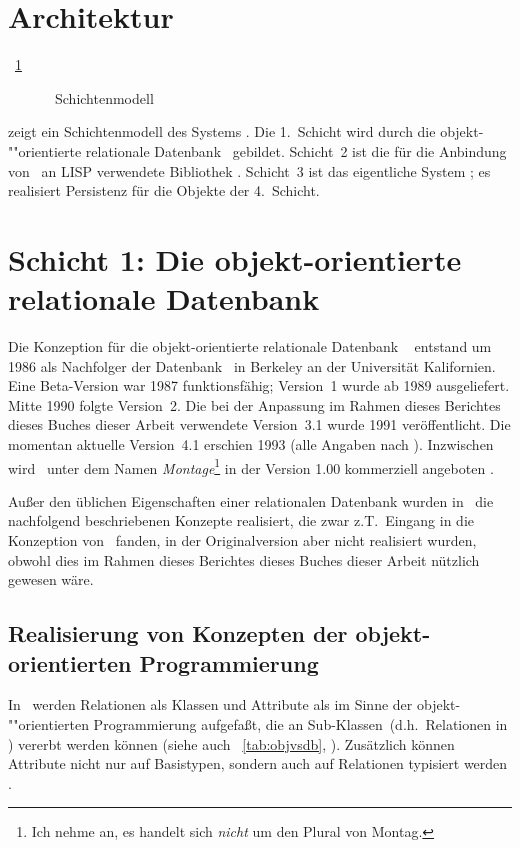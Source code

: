 \section{Architektur}
%
\figurename~\ref{fig:sohlay} %
%
\begin{figure}[htbp]%
\ifbuch%
\centerline{}%
\else%
\centerline{}%
\fi%
\caption{\protect\soh\ Schichtenmodell}%
\label{fig:sohlay}%
\end{figure}%
%
zeigt ein Schichtenmodell des Systems \soh. Die 1.~Schicht wird durch
die ob\-jekt-""orien\-tier\-te relationale Datenbank
\postgres\ gebildet. Schicht~2 ist die f\"{u}r die Anbindung von
\postgres\ an LISP verwendete Bibliothek . Schicht~3 ist
das eigentliche System \soh; es realisiert Persistenz f\"{u}r die Objekte
der 4.~Schicht.
%
\section{Schicht 1: Die objekt-orientierte relationale Datenbank
\protect\postgres}
%
Die Konzeption f\"{u}r die objekt-orientierte relationale
\cite[]{bib:sto89} Datenbank \postgres\ \cite{bib:sto86a}
entstand um 1986 als Nachfolger der Datenbank \ingres\ in Berkeley an
der Universit\"{a}t Kalifornien. Eine Beta-Version war 1987
funktionsf\"{a}hig; Version~1 wurde ab 1989 ausgeliefert. Mitte 1990
folgte Version~2. Die bei der Anpassung im Rahmen \ifbericht dieses
Berichtes \else\ifbuch dieses Buches \else dieser Arbeit \fi\fi
verwendete Version~3.1 wurde 1991 ver\"{o}ffentlicht. Die momentan
aktuelle Version~4.1 erschien 1993 (alle Angaben nach
\cite[]{bib:rh93}).  Inzwischen wird \postgres\ unter dem
Namen {\em Montage\/}\footnote{Ich nehme an, es handelt sich {\em
    nicht\/} um den Plural von Montag.} in der Version 1.00
kommerziell angeboten \cite[]{bib:on94}.
%
\par{}Au\ss{}er den \"{u}blichen Eigenschaften einer relationalen Datenbank
wurden in \postgres\ die nachfolgend beschriebenen Konzepte
realisiert, die zwar z.T.\ Eingang in die Konzeption von \soh\ fanden,
in der Originalversion aber nicht realisiert wurden, obwohl dies im
Rahmen \ifbericht dieses Berichtes \else\ifbuch dieses Buches \else
dieser Arbeit \fi\fi n\"{u}tzlich gewesen w\"{a}re.
%
\subsection{Realisierung von Konzepten der objekt-orientierten
Programmierung}
%
In \postgres\ werden Relationen als Klassen und Attribute als
\Slt[s]\/ im Sinne der ob\-jekt-""orien\-tier\-ten Programmierung
aufgefa\ss{}t, die an Sub-\rglq{}Klas\-sen\rgrq\ (d.h.\ Relationen in
\postgres) vererbt werden k\"{o}n\-nen \cite[]{bib:rh93}
(siehe auch \tablename~\ref{tab:objvsdb},
\citepage{\pageref{tab:objvsdb}}). Zus\"{a}tzlich k\"{o}nnen Attribute nicht
nur auf Basistypen, sondern auch auf Relationen typisiert werden
\cite[]{bib:rh93}.
%
